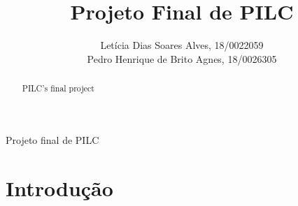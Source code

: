 \documentclass[12pt]{article}
\title{Projeto Final de PILC}
\author{Letícia Dias Soares Alves, 18/0022059\\
	Pedro Henrique de Brito Agnes, 18/0026305
}
\begin{document}
 
\maketitle

 \begin{abstract}
   PILC's final project
 \end{abstract}

 \begin{resumo} 
  Projeto final de PILC
 \end{resumo}

\section{Introdução}

\lipsum
\end{document}
